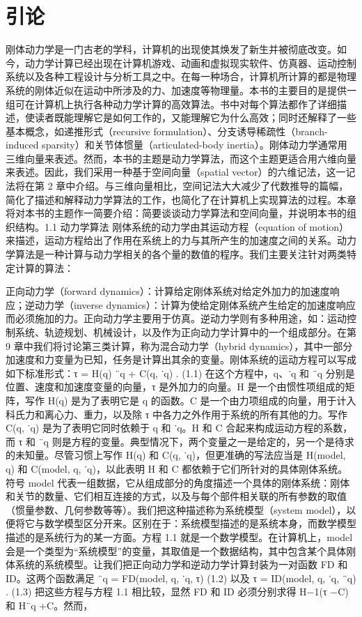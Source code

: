 \chapter{引论}
\label{chap:1}
刚体动力学是一门古老的学科，计算机的出现使其焕发了新生并被彻底改变。如今，动力学计算已经出现在计算机游戏、动画和虚拟现实软件、仿真器、运动控制系统以及各种工程设计与分析工具之中。在每一种场合，计算机所计算的都是物理系统的刚体近似在运动中所涉及的力、加速度等物理量。本书的主要目的是提供一组可在计算机上执行各种动力学计算的高效算法。书中对每个算法都作了详细描述，使读者既能理解它是如何工作的，又能理解它为什么高效；同时还解释了一些基本概念，如递推形式（recursive formulation）、分支诱导稀疏性（branch-induced sparsity）和关节体惯量（articulated-body inertia）。刚体动力学通常用三维向量来表述。然而，本书的主题是动力学算法，而这个主题更适合用六维向量来表述。因此，我们采用一种基于空间向量（spatial vector）的六维记法，这一记法将在第 2 章中介绍。与三维向量相比，空间记法大大减少了代数推导的篇幅，简化了描述和解释动力学算法的工作，也简化了在计算机上实现算法的过程。本章将对本书的主题作一简要介绍：简要谈谈动力学算法和空间向量，并说明本书的组织结构。1.1 动力学算法 刚体系统的动力学由其运动方程（equation of motion）来描述，运动方程给出了作用在系统上的力与其所产生的加速度之间的关系。动力学算法是一种计算与动力学相关的各个量的数值的程序。我们主要关注针对两类特定计算的算法：

正向动力学（forward dynamics）：计算给定刚体系统对给定外加力的加速度响应；逆动力学（inverse dynamics）：计算为使给定刚体系统产生给定的加速度响应而必须施加的力。正向动力学主要用于仿真。逆动力学则有多种用途，如：运动控制系统、轨迹规划、机械设计，以及作为正向动力学计算中的一个组成部分。在第 9 章中我们将讨论第三类计算，称为混合动力学（hybrid dynamics），其中一部分加速度和力变量为已知，任务是计算出其余的变量。刚体系统的运动方程可以写成如下标准形式：τ = H(q) ¨q + C(q, ˙q) . (1.1) 在这个方程中，q、˙q 和 ¨q 分别是位置、速度和加速度变量的向量，τ 是外加力的向量。H 是一个由惯性项组成的矩阵，写作 H(q) 是为了表明它是 q 的函数。C 是一个由力项组成的向量，用于计入科氏力和离心力、重力，以及除 τ 中各力之外作用于系统的所有其他的力。写作 C(q, ˙q) 是为了表明它同时依赖于 q 和 ˙q。H 和 C 合起来构成运动方程的系数，而 τ 和 ¨q 则是方程的变量。典型情况下，两个变量之一是给定的，另一个是待求的未知量。尽管习惯上写作 H(q) 和 C(q, ˙q)，但更准确的写法应当是 H(model, q) 和 C(model, q, ˙q)，以此表明 H 和 C 都依赖于它们所针对的具体刚体系统。符号 model 代表一组数据，它从组成部分的角度描述一个具体的刚体系统：刚体和关节的数量、它们相互连接的方式，以及与每个部件相关联的所有参数的取值（惯量参数、几何参数等等）。我们把这种描述称为系统模型（system model），以便将它与数学模型区分开来。区别在于：系统模型描述的是系统本身，而数学模型描述的是系统行为的某一方面。方程 1.1 就是一个数学模型。在计算机上，model 会是一个类型为“系统模型”的变量，其取值是一个数据结构，其中包含某个具体刚体系统的系统模型。让我们把正向动力学和逆动力学计算封装为一对函数 FD 和 ID。这两个函数满足 ¨q = FD(model, q, ˙q, τ) (1.2) 以及 τ = ID(model, q, ˙q, ¨q) . (1.3) 把这些方程与方程 1.1 相比较，显然 FD 和 ID 必须分别求得 H−1(τ −C) 和 H¨q +C。然而，

